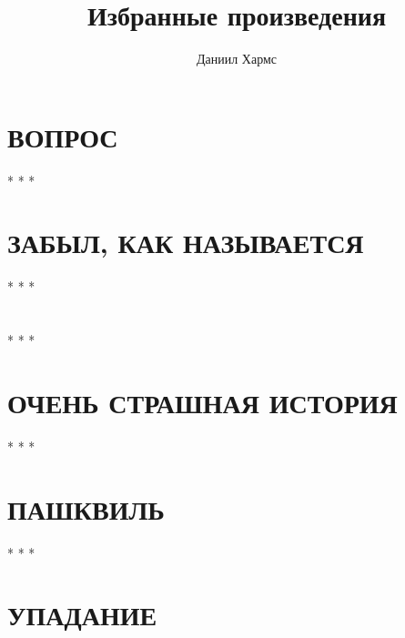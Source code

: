 \documentclass{book}
\title{Избранные произведения}
\author{Даниил Хармс}
\date{}
\begin{document}
\maketitle
\tableofcontents

\chapter{ВОПРОС}


\begin{center}
* * *
\end{center}

\chapter{ЗАБЫЛ, КАК НАЗЫВАЕТСЯ}


\begin{center}
* * *
\end{center}

\chapter{}


\begin{center}
* * *
\end{center}

\chapter{ОЧЕНЬ СТРАШНАЯ ИСТОРИЯ}


\begin{center}
* * *
\end{center}

\chapter{ПАШКВИЛЬ}


\begin{center}
* * *
\end{center}

\chapter{УПАДАНИЕ}

\end{document}
